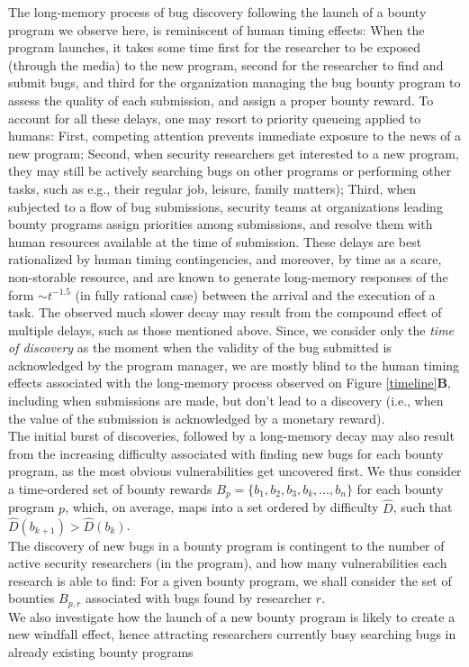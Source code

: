 The long-memory process of bug discovery following the launch of a bounty program we observe here, is reminiscent of human timing effects: When the program launches, it takes some time first for the researcher to be exposed (through the media) to the new program, second for the researcher to find and submit bugs, and third for the organization managing the bug bounty program to assess the quality of each submission, and assign a proper bounty reward. To account for all these delays, one may resort to priority queueing applied to humans: First, competing attention prevents immediate exposure to the news of a new program; Second, when security researchers get interested to a new program, they may still be actively searching bugs on other programs or performing other tasks, such as e.g., their regular job, leisure, family matters); Third, when subjected to a flow of bug submissions, security teams at organizations leading bounty programs assign priorities among submissions, and resolve them with human resources available at the time of submission. These delays are best rationalized by human timing contingencies, and moreover, by time as a scare, non-storable resource, and are known to generate long-memory responses of the form $\sim t^{-1.5}$ (in fully rational case) between the arrival and the execution of a task\cite{maillart2011quantification}. The observed much slower decay may result from the compound effect of multiple delays, such as those mentioned above. Since, we consider only the {\it time of discovery} as the moment when the validity of the bug submitted is acknowledged by the program manager, we are mostly blind to the human timing effects associated with the long-memory process observed on Figure \ref{timeline}{\bf B}, including when submissions are made, but don't lead to a discovery (i.e., when the value of the submission is acknowledged by a monetary reward).\\

The initial burst of discoveries, followed by a long-memory decay may also result from the increasing difficulty associated with finding new bugs for each bounty program, as the most obvious vulnerabilities get uncovered first. We thus consider a time-ordered set of bounty rewards $B_p= \{b_1,b_2,b_3,b_k, ..., b_n\}$ for each bounty program $p$, which, on average, maps into a set ordered by difficulty $\widehat{D}$, such that $\widehat{D}(b_{k+1}) > \widehat{D}(b_{k})$.\\
 
The discovery of new bugs in a bounty program is contingent to the number of active security researchers (in the program), and how many vulnerabilities each research is able to find: For a given bounty program, we shall consider the set of bounties $B_{p,r}$ associated with bugs found by researcher $r$.\\

We also investigate how the launch of a new bounty program is likely to create a new windfall effect, hence attracting researchers currently busy searching bugs in already existing bounty programs




